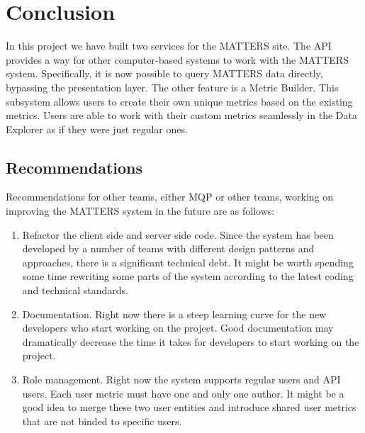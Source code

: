 \chapter{Conclusion}

	In this project we have built two services for the MATTERS site. The API 
	provides a way for other computer-based systems to work with the MATTERS 
	system. Specifically, it is now possible to query MATTERS data directly, 
	bypassing the presentation layer. The other feature is a Metric Builder. 
	This subsystem allows users to create their own unique metrics based on 
	the existing metrics. Users are able to work with their custom metrics seamlessly 
	in the Data Explorer as if they were just regular ones.  

	\section{Recommendations}
		
		Recommendations for other teams, either MQP or other teams, working on improving the MATTERS system in the future are as follows:
		
		\begin{enumerate}
			\item
				Refactor the client side and server side code. Since the system 
				has been developed by a number of teams with different design 
				patterns and approaches, there is a significant technical debt. 
				It might be worth spending some time rewriting some parts of the system 
				according to the latest coding and technical standards.
			\item
				Documentation. Right now there is a steep learning curve for the new 
				developers who start working on the project. Good documentation may 
				dramatically decrease the time it takes for developers to start working 
				on the project.
			\item
				Role management. Right now the system supports regular users and API users. 
				Each user metric must have one and only one author. It might be a good idea 
				to merge these two user entities and introduce shared user metrics that are 
				not binded to specific users.
		\end{enumerate}
		